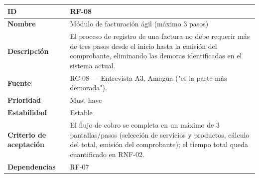 {\def\LTcaptype{none} %
\begin{longtable}[]{@{}
  >{\raggedright\arraybackslash}p{}
  >{\raggedright\arraybackslash}p{}@{}}
\toprule\noalign{}
\begin{minipage}[b]{\linewidth}\raggedright
\textbf{ID}
\end{minipage} & \begin{minipage}[b]{\linewidth}\raggedright
RF-08
\end{minipage} \\
\midrule\noalign{}
\endhead
\bottomrule\noalign{}
\endlastfoot
\textbf{Nombre} & \begin{minipage}[t]{\linewidth}\raggedright
Módulo de facturación ágil (máximo 3 pasos)
\end{minipage} \\
\textbf{Descripción} & \begin{minipage}[t]{\linewidth}\raggedright
El proceso de registro de una factura no debe requerir más de tres pasos
desde el inicio hasta la emisión del comprobante, eliminando las demoras
identificadas en el sistema actual.
\end{minipage} \\
\textbf{Fuente} & \begin{minipage}[t]{\linewidth}\raggedright
RC-08 --- Entrevista A3, Amagua ("es la parte más demorada").
\end{minipage} \\
\textbf{Prioridad} & \begin{minipage}[t]{\linewidth}\raggedright
Must have
\end{minipage} \\
\textbf{Estabilidad} & \begin{minipage}[t]{\linewidth}\raggedright
Estable
\end{minipage} \\
\textbf{Criterio de aceptación} &
\begin{minipage}[t]{\linewidth}\raggedright
El flujo de cobro se completa en un máximo de 3 pantallas/pasos
(selección de servicios y productos, cálculo del total, emisión del
comprobante); el tiempo total queda cuantificado en RNF-02.
\end{minipage} \\
\textbf{Dependencias} & \begin{minipage}[t]{\linewidth}\raggedright
RF-07
\end{minipage} \\
\end{longtable}
}

